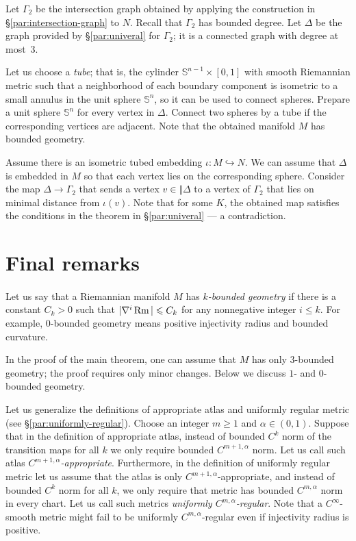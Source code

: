 \documentclass[a4paper,10pt]{article}
\begin{document}
Let $\Gamma_2$ be the intersection graph obtained by applying the construction in §\ref{par:intersection-graph} to $N$.
Recall that $\Gamma_2$ has bounded degree.
Let $\Delta$ be the graph provided by §\ref{par:univeral} for $\Gamma_2$;
it is a connected graph with  degree at most~3.

Let us choose a \emph{tube}; that is, the cylinder $\mathbb{S}^{n-1}\times [0,1]$ with smooth Riemannian metric such that a neighborhood of each boundary component is isometric to a small annulus in the unit sphere $\mathbb{S}^n$, so it can be used to connect spheres.
Prepare a unit sphere $\mathbb{S}^n$ for every vertex in $\Delta$.
Connect two spheres by a tube if the corresponding vertices are adjacent.
Note that the obtained manifold $M$ has bounded geometry.

Assume there is an isometric tubed embedding $\iota\colon M\hookrightarrow N$.
We can assume that $\Delta$ is embedded in $M$ so that each vertex lies on the corresponding sphere.
Consider the map $\Delta\to \Gamma_2$ that sends a vertex $v\in \Vert \Delta$ to a vertex of $\Gamma_2$ that lies on minimal distance from $\iota(v)$.
Note that for some $K$, the obtained map satisfies the conditions in the theorem in §\ref{par:univeral} --- a contradiction.
\qeds





\section*{Final remarks}


\paragraph{}\label{par:remarks}
Let us say that a Riemannian manifold $M$ has \emph{$k$-bounded geometry} if there is a constant $C_k > 0$ such that $|\nabla^i \operatorname{\rm Rm}| \leqslant C_k$ for any nonnegative integer $i\le k$.
For example, $0$-bounded geometry means positive injectivity radius and bounded curvature.


In the proof of the main theorem, one can assume that $M$ has only $3$-bounded geometry;
the proof requires only minor changes.
Below we discuss $1$- and $0$-bounded geometry.

Let us generalize the definitions of appropriate atlas and uniformly regular metric (see §\ref{par:uniformly-regular}).
Choose an integer $m\ge 1$ and $\alpha\in(0,1)$.
Suppose that in the definition of appropriate atlas,
instead of bounded $C^k$ norm of the transition maps for all $k$ 
we only require bounded $C^{m+1,\alpha}$ norm.
Let us call such atlas \emph{$C^{m+1,\alpha}$-appropriate}.
Furthermore, in the definition of uniformly regular metric let us assume that the atlas is only $C^{m+1,\alpha}$-appropriate, and instead of bounded $C^k$ norm for all $k$,
we only require that metric has bounded $C^{m,\alpha}$ norm in every chart.
Let us call such metrics \emph{uniformly $C^{m,\alpha}$-regular}.
Note that a $C^\infty$-smooth metric might fail to be uniformly $C^{m,\alpha}$-regular even if injectivity radius is positive.
\end{document}
